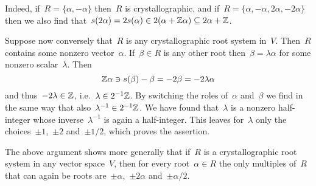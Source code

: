 \begin{example}
\begin{enumerate}
      Indeed, if~$R = \{\alpha, -\alpha\}$ then~$R$ is crystallographic, and if~$R = \{\alpha, -\alpha, 2\alpha, -2\alpha\}$ then we also find that~$s(2\alpha) = 2s(\alpha) \in 2(\alpha + \mathbb{Z} \alpha) \subseteq 2\alpha + \mathbb{Z}$.
      
      Suppose now conversely that~$R$ is any crystallographic root system in~$V$.
      Then~$R$ contains some nonzero vector~$\alpha$.
      If~$\beta \in R$ is any other root then~$\beta = \lambda \alpha$ for some nonzero scalar~$\lambda$.
      Then
      \[
        \mathbb{Z} \alpha
        \ni
        s(\beta) - \beta
        =
        -2 \beta
        =
        -2 \lambda \alpha
      \]
      and thus~$-2 \lambda \in \mathbb{Z}$, i.e.~$\lambda \in 2^{-1} \mathbb{Z}$.
      By switching the roles of~$\alpha$ and~$\beta$ we find in the same way that also~$\lambda^{-1} \in 2^{-1} \mathbb{Z}$.
      We have found that~$\lambda$ is a nonzero half-integer whose inverse~$\lambda^{-1}$ is again a half-integer.
      This leaves for~$\lambda$ only the choices~$\pm 1$,~$\pm 2$ and~$\pm 1/2$, which proves the assertion.
  \end{enumerate}
  
  The above argument shows more generally that if~$R$ is a crystallographic root system in any vector space~$V$, then for every root~$\alpha \in R$ the only multiples of~$R$ that can again be roots are~$\pm \alpha$,~$\pm 2 \alpha$ and~$\pm \alpha/2$.
\end{example}


